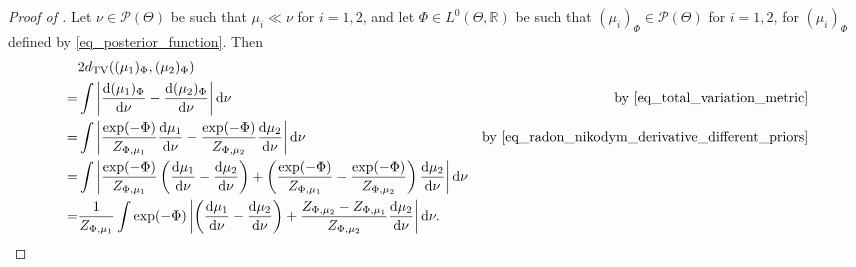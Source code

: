 \documentclass[a4paper]{scrartcl}
\theoremstyle{definition}
\numberwithin{equation}{section}
\newcommand{\R}{\mathbb{R}}
\newcommand{\rd}{\mathrm{d}}
\newcommand{\Abs}[1]{\left\vert#1\right\vert}
\newcommand{\TV}[0]{\textup{TV}}
\begin{document}
\TVboundsPriorperturbationTriangle*
\begin{proof}[Proof of ]
Let $\nu\in\mathcal{P}(\Theta)$ be such that $\mu_i\ll \nu$ for $i=1,2$, and let $\Phi\in L^0(\Theta,\R)$ be such that $(\mu_i)_\Phi\in\mathcal{P}(\Theta)$ for $i=1,2$, for $(\mu_i)_\Phi$ defined by \eqref{eq_posterior_function}.
Then
\begin{align}
 &2d_{\TV}((\mu_1)_\Phi,(\mu_2)_\Phi)
 \nonumber
 \\
 =&\int\Abs{\frac{\rd (\mu_1)_\Phi}{\rd \nu}-\frac{\rd (\mu_2)_\Phi}{\rd \nu}} \rd \nu & \text{by \eqref{eq_total_variation_metric}}
 \nonumber
 \\
 =& \int \Abs{ \frac{\exp(-\Phi)}{Z_{\Phi,\mu_1}}\frac{\rd \mu_1}{\rd \nu}-\frac{\exp(-\Phi)}{Z_{\Phi,\mu_2}}\frac{\rd \mu_2}{\rd \nu}}\rd \nu
 \nonumber & \text{by \eqref{eq_radon_nikodym_derivative_different_priors}}
 \\
 =& \int \Abs{ \frac{\exp(-\Phi)}{Z_{\Phi,\mu_1}}\left(\frac{\rd \mu_1}{\rd \nu}-\frac{\rd \mu_2}{\rd \nu}\right)+\left(\frac{\exp(-\Phi)}{Z_{\Phi,\mu_1}}-\frac{\exp(-\Phi)}{Z_{\Phi,\mu_2}}\right)
 \frac{\rd \mu_2}{\rd \nu}}\rd \nu
 \nonumber
\\
 =& \frac{1}{Z_{\Phi,\mu_1}}\int \exp(-\Phi) \Abs{ \left(\frac{\rd \mu_1}{\rd \nu}-\frac{\rd \mu_2}{\rd \nu}\right)+\frac{Z_{\Phi,\mu_2}-Z_{\Phi,\mu_1}}{Z_{\Phi,\mu_2}} \frac{\rd \mu_2}{\rd \nu}}\rd \nu .
 \label{eq_TV_metric_different_priors}
 \end{align}


\end{proof}
\end{document}
